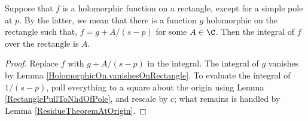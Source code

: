 \begin{lemma}[ResidueTheoremOnRectangleWithSimplePole]
\label{ResidueTheoremOnRectangleWithSimplePole}
\leanok
Suppose that $f$ is a holomorphic function on a rectangle,
  except for a simple pole at $p$.
  By the latter, we mean that there is a function $g$
  holomorphic on the rectangle such that,
  $f = g + A/(s-p)$ for some $A\in\C$. Then the integral of
  $f$ over the rectangle is $A$.
\end{lemma}
\begin{proof}
\leanok
Replace $f$ with $g + A/(s-p)$ in the integral.
  The integral of $g$ vanishes by
  Lemma \ref{HolomorphicOn.vanishesOnRectangle}.
  To evaluate the integral of $1/(s-p)$, pull everything to a
  square about the origin using
  Lemma \ref{RectanglePullToNhdOfPole}, and rescale by $c$;
  what remains is handled by
  Lemma \ref{ResidueTheoremAtOrigin}.
\end{proof}
